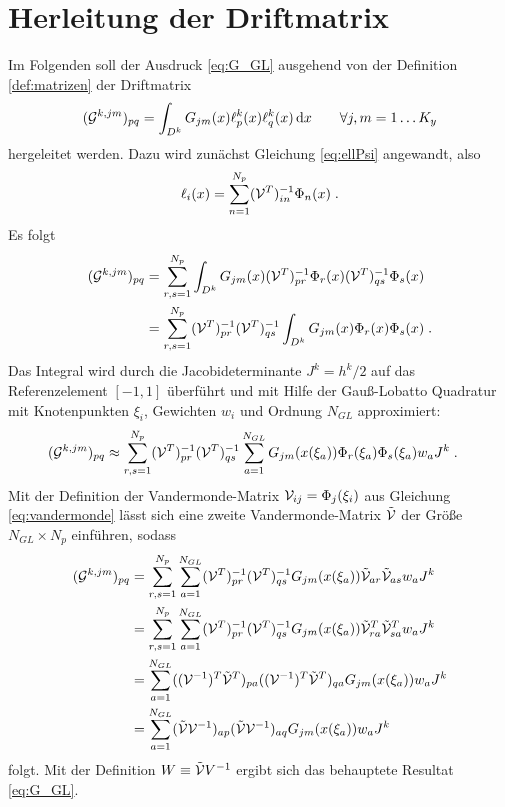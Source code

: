 \section{Herleitung der Driftmatrix}\label{sec:A_5}
Im Folgenden soll der Ausdruck \eqref{eq:G_GL} ausgehend von der Definition \ref{def:matrizen} der Driftmatrix
\begin{equation*}
  (\drift^{k,jm})_{pq} = \int_{D^k} G_{jm}(x) \ell_p^k(x) \ell_q^k(x) \diff x \qquad \forall j,m=1\dots K_y %
\end{equation*}
hergeleitet werden. Dazu wird zunächst Gleichung \eqref{eq:ellPsi} angewandt, also
\begin{equation*}
  \ell_i(x) = \sum_{n=1}^{N_p} (\mathcal{V}^T)^{-1}_{in}\Phi_n(x) \; .
\end{equation*}
Es folgt
\begin{align*}
    (\mathcal{G}^{k,jm})_{pq} &= \sum_{r,s=1}^{N_p}\int_{D^k} G_{jm}(x) (\mathcal{V}^T)^{-1}_{pr}\Phi_r(x) (\mathcal{V}^T)^{-1}_{qs}\Phi_s(x) \\
     &= \sum_{r,s=1}^{N_p} (\mathcal{V}^T)^{-1}_{pr} (\mathcal{V}^T)^{-1}_{qs}  \int_{D^k} G_{jm}(x) \Phi_r(x) \Phi_s(x) \; .
\end{align*}
Das Integral wird durch die Jacobideterminante $J^k=h^k/2$ auf das Referenzelement $[-1,1]$ überführt und mit Hilfe der Gauß-Lobatto Quadratur mit Knotenpunkten $\xi_i$, Gewichten $w_i$ und Ordnung $N_{GL}$ approximiert:
\begin{align*}
    (\mathcal{G}^{k,jm})_{pq} &\approx \sum_{r,s=1}^{N_p} (\mathcal{V}^T)^{-1}_{pr} (\mathcal{V}^T)^{-1}_{qs}  \sum_{a=1}^{N_{GL}} G_{jm}(x(\xi_a)) \Phi_r(\xi_a) \Phi_s(\xi_a) w_a J^k\; .
\end{align*}
Mit der Definition der Vandermonde-Matrix $\mathcal{V}_{ij}=\Phi_j(\xi_i)$ aus Gleichung \eqref{eq:vandermonde} lässt sich eine zweite Vandermonde-Matrix $\tilde{\mathcal{V}}$ der Größe $N_{GL}\times N_p$ einführen, sodass
\begin{align*}
  (\mathcal{G}^{k,jm})_{pq} &= \sum_{r,s=1}^{N_p}\sum_{a=1}^{N_{GL}} (\mathcal{V}^T)^{-1}_{pr} (\mathcal{V}^T)^{-1}_{qs}   G_{jm}(x(\xi_a)) \tilde{\mathcal{V}}_{ar} \tilde{\mathcal{V}}_{as} w_a J^k \\
  &= \sum_{r,s=1}^{N_p}\sum_{a=1}^{N_{GL}} (\mathcal{V}^T)^{-1}_{pr} (\mathcal{V}^T)^{-1}_{qs}   G_{jm}(x(\xi_a)) \tilde{\mathcal{V}}_{ra}^T \tilde{\mathcal{V}}_{sa}^T w_a J^k \\
  &= \sum_{a=1}^{N_{GL}} ((\mathcal{V}^{-1})^T \tilde{\mathcal{V}}^T)_{pa} ((\mathcal{V}^{-1})^T \tilde{\mathcal{V}}^T)_{qa}   G_{jm}(x(\xi_a))   w_a J^k \\
  &= \sum_{a=1}^{N_{GL}} (\tilde{\mathcal{V}} \mathcal{V}^{-1})_{ap} (\tilde{\mathcal{V}} \mathcal{V}^{-1})_{aq}   G_{jm}(x(\xi_a))   w_a J^k
\end{align*}
folgt. Mit der Definition $W\equiv\tilde{\mathcal{V}}V^{-1}$ ergibt sich das behauptete Resultat \eqref{eq:G_GL}.
